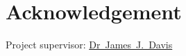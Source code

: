\renewcommand{\baselinestretch}{1.5}
\chapter{Acknowledgement}
\renewcommand{\baselinestretch}{\mystretch}


Project supervisor: \href{james.davis06@imperial.ac.uk}{Dr~James~J.~Davis}
